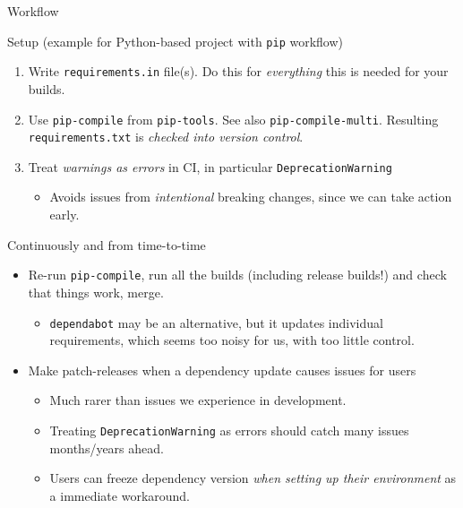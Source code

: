 \documentclass[english,aspectratio=1610,smaller]{beamer}
\begin{document}
\begin{frame}{Workflow}
  \begin{block}{Setup (example for Python-based project with \texttt{pip} workflow)}
    \begin{enumerate}
      \item Write \texttt{requirements.in} file(s).
        Do this for \emph{everything} this is needed for your builds.
      \item Use \texttt{pip-compile} from \texttt{pip-tools}. See also \texttt{pip-compile-multi}.
        Resulting \texttt{requirements.txt} is \emph{checked into version control}.
      \item Treat \emph{warnings as errors} in CI, in particular \texttt{DeprecationWarning}
        \begin{itemize}
          \item Avoids issues from \emph{intentional} breaking changes, since we can take action early.
        \end{itemize}
    \end{enumerate}
  \end{block}
  \begin{block}{Continuously and from time-to-time}
    \begin{itemize}
      \item Re-run \texttt{pip-compile}, run all the builds (including release builds!) and check that things work, merge.
        \begin{itemize}
          \item \texttt{dependabot} may be an alternative, but it updates individual requirements, which seems too noisy for us, with too little control.
        \end{itemize}
      \item Make patch-releases when a dependency update causes issues for users
        \begin{itemize}
          \item Much rarer than issues we experience in development.
          \item Treating \texttt{DeprecationWarning} as errors should catch many issues months/years ahead.
          \item Users can freeze dependency version \emph{when setting up their environment} as a immediate workaround.
        \end{itemize}
    \end{itemize}
  \end{block}
\end{frame}
\end{document}
